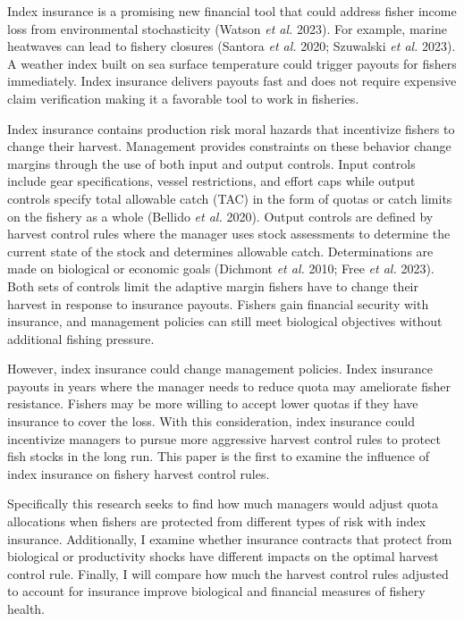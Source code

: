 \documentclass[
  letterpaper,
  DIV=11,
  numbers=noendperiod]{scrartcl}
\begin{document}
Index insurance is a promising new financial tool that could address
fisher income loss from environmental stochasticity (Watson \emph{et
al.} 2023). For example, marine heatwaves can lead to fishery closures
(Santora \emph{et al.} 2020; Szuwalski \emph{et al.} 2023). A weather
index built on sea surface temperature could trigger payouts for fishers
immediately. Index insurance delivers payouts fast and does not require
expensive claim verification making it a favorable tool to work in
fisheries.

Index insurance contains production risk moral hazards that incentivize
fishers to change their harvest. Management provides constraints on
these behavior change margins through the use of both input and output
controls. Input controls include gear specifications, vessel
restrictions, and effort caps while output controls specify total
allowable catch (TAC) in the form of quotas or catch limits on the
fishery as a whole (Bellido \emph{et al.} 2020). Output controls are
defined by harvest control rules where the manager uses stock
assessments to determine the current state of the stock and determines
allowable catch. Determinations are made on biological or economic goals
(Dichmont \emph{et al.} 2010; Free \emph{et al.} 2023). Both sets of
controls limit the adaptive margin fishers have to change their harvest
in response to insurance payouts. Fishers gain financial security with
insurance, and management policies can still meet biological objectives
without additional fishing pressure.

However, index insurance could change management policies. Index
insurance payouts in years where the manager needs to reduce quota may
ameliorate fisher resistance. Fishers may be more willing to accept
lower quotas if they have insurance to cover the loss. With this
consideration, index insurance could incentivize managers to pursue more
aggressive harvest control rules to protect fish stocks in the long run.
This paper is the first to examine the influence of index insurance on
fishery harvest control rules.

Specifically this research seeks to find how much managers would adjust
quota allocations when fishers are protected from different types of
risk with index insurance. Additionally, I examine whether insurance
contracts that protect from biological or productivity shocks have
different impacts on the optimal harvest control rule. Finally, I will
compare how much the harvest control rules adjusted to account for
insurance improve biological and financial measures of fishery health.
\end{document}
